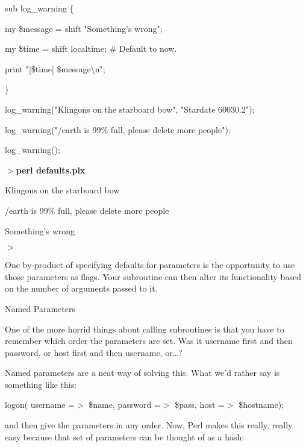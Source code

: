 \documentclass[a4paper,11pt]{book}
\begin{document}
\noindent 

\noindent sub log\_warning \{

\noindent my \$message = shift \textbar \textbar  "Something's wrong";

\noindent my \$time = shift \textbar \textbar  localtime; \# Default to now.

\noindent print "[\$time] \$message\textbackslash n";

\noindent \}

\noindent 

\noindent log\_warning("Klingons on the starboard bow", "Stardate 60030.2");

\noindent log\_warning("/earth is 99\% full, please delete more people");

\noindent log\_warning();

\noindent 

\noindent $>$\textbf{perl defaults.plx}

\noindent [Stardate 60030.2] Klingons on the starboard bow

 /earth is 99\% full, please delete more people

 Something's wrong

\noindent $>$

\noindent 

\noindent One by-product of specifying defaults for parameters is the opportunity to use those parameters as flags. Your subroutine can then alter its functionality based on the number of arguments passed to it.

\noindent 

\noindent 

\noindent Named Parameters

\noindent One of the more horrid things about calling subroutines is that you have to remember which order the parameters are set. Was it username first and then password, or host first and then username, or\dots ?

\noindent 

\noindent Named parameters are a neat way of solving this. What we'd rather say is something like this:

\noindent 

\noindent logon( username =$>$ \$name, password =$>$ \$pass, host =$>$ \$hostname);

\noindent 

\noindent and then give the parameters in any order. Now, Perl makes this really, really easy because that set of parameters can be thought of as a hash:
\end{document}
